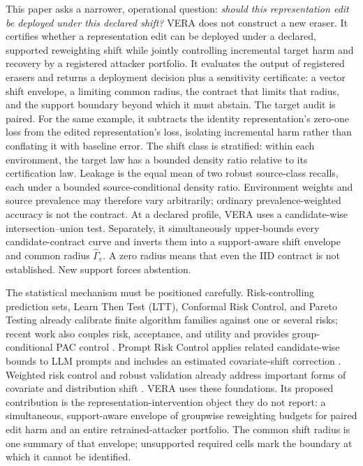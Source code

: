 This paper asks a narrower, operational question: \emph{should this
representation edit be deployed under this declared shift?} VERA does not
construct a new eraser. It certifies whether a representation edit can be
deployed under a declared, supported reweighting shift while jointly
controlling incremental target harm and recovery by a registered attacker
portfolio. It evaluates the output of registered erasers and
returns a deployment decision plus a sensitivity certificate: a vector shift
envelope, a limiting common radius, the contract that limits that radius, and
the support boundary beyond which it must abstain. The target audit is paired.
For the same example, it subtracts the identity representation's zero-one loss
from the edited representation's loss, isolating incremental harm rather than
conflating it with baseline error. The shift class is stratified: within each
environment, the target law has a bounded density ratio relative to its
certification law. Leakage is the equal mean of two robust source-class
recalls, each under a bounded source-conditional density ratio. Environment
weights and source prevalence may therefore vary arbitrarily; ordinary
prevalence-weighted accuracy is not the contract. At a declared profile, VERA
uses a candidate-wise intersection--union test. Separately, it simultaneously
upper-bounds every candidate-contract curve and inverts them into a
support-aware shift envelope and common radius $\widehat\Gamma_e$. A zero
radius means that even the IID contract is not established. New support forces
abstention.

The statistical mechanism must be positioned carefully. Risk-controlling
prediction sets, Learn Then Test (LTT), Conformal Risk Control, and Pareto
Testing already calibrate finite algorithm families against one or several
risks; recent work also couples risk, acceptance, and utility and provides
group-conditional PAC control
\cite{bates2021rcps,angelopoulos2025ltt,angelopoulos2024crc,laufer2023pareto,yu2026joint,huang2026conditional}.
Prompt Risk Control applies related candidate-wise bounds to LLM prompts and
includes an estimated covariate-shift correction \cite{zollo2024prompt}.
Weighted risk control and robust validation already address important forms of
covariate and distribution shift
\cite{tibshirani2019covariate,almeida2025hprc,cauchois2024robust,ai2024finegrained}.
VERA uses these foundations. Its proposed contribution is the
representation-intervention object they do not report: a simultaneous,
support-aware envelope of groupwise reweighting budgets for paired edit harm
and an entire retrained-attacker portfolio. The common shift radius is one
summary of that envelope; unsupported required cells mark the boundary at which
it cannot be identified.

